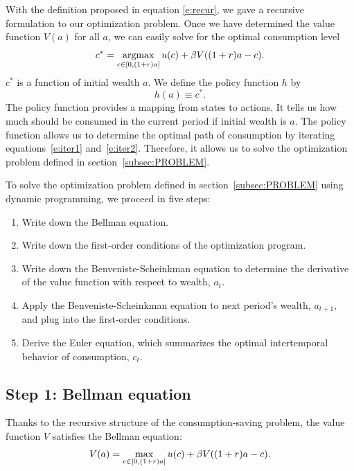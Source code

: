 \documentclass[letterpaper, 11pt, leqno]{article}
\begin{document}
With the definition proposed in equation \eqref{e:recur}, we gave a recursive formulation to our optimization problem. Once we have determined the value function $V(a)$ for all $a$, we can easily solve for the optimal consumption level
\begin{equation*}
c^*=\operatorname*{argmax}_{c\in[0,(1+r) a]}u(c)+\beta V((1+r) a-c).
\end{equation*}
$c^*$ is a function of initial wealth $a$. We define the policy function $h$ by
\begin{equation*}
h(a)\equiv c^*.
\end{equation*}
The policy function provides a mapping from states to actions. It tells us how much should be consumed in the current period if initial wealth is $a$. The policy function allows us to determine the optimal path of consumption by iterating equations~\eqref{e:iter1} and~\eqref{e:iter2}. Therefore, it allows us to solve the optimization problem defined in section~\ref{subsec:PROBLEM}. 

To solve the optimization problem defined in section~\ref{subsec:PROBLEM} using dynamic programming, we proceed in five steps:
\begin{enumerate}
\item Write down the Bellman equation.
\item Write down the first-order conditions of the optimization program.
\item Write down the Benveniste-Scheinkman equation to determine the derivative of the value function with respect to wealth, $a_{t}$.
\item Apply the Benveniste-Scheinkman equation to next period's wealth, $a_{t+1}$, and plug into the first-order conditions.
\item Derive the Euler equation, which summarizes the optimal intertemporal behavior of consumption, $c_{t}$.
\end{enumerate}

\subsection{Step 1: Bellman equation}

Thanks to the recursive structure of the consumption-saving problem, the value function $V$ satisfies the Bellman equation:
\begin{align}
V(a)=\max_{c\in[0,(1+r) a]}u(c)+\b V((1+r) a-c)\label{e:bellman}.
\end{align}
\end{document}
